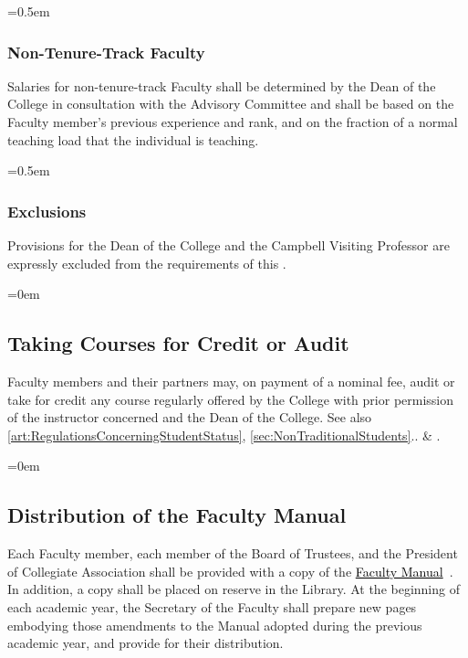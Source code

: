 \documentclass{manual}
\newcommand{\keyword}[1]{\textcolor{black}{#1}}
\newcommand{\facman}{\keyword{\underline{Faculty Manual}}~}
\let\oldsubsection\subsection
\renewcommand\subsection{\leftskip=0em\oldsubsection}
\let\oldsubsubsection\subsubsection
\renewcommand\subsubsection{\leftskip=0.5em\oldsubsubsection}
\begin{document}
\subsubsection{Non-Tenure-Track Faculty}
Salaries for non-tenure-track Faculty shall be determined by the Dean of the College in consultation with the Advisory Committee and shall be based on the Faculty member's previous experience and rank, and on the fraction of a normal teaching load that the individual is teaching.

\subsubsection{Exclusions}
Provisions for the Dean of the College and the Campbell Visiting Professor are expressly excluded from the requirements of this .


\subsection{Taking Courses for Credit or Audit}
Faculty members and their partners may, on payment of a nominal fee, audit or take for credit any course regularly offered by the College with prior permission of the instructor concerned and the Dean of the College. See also \cref{art:RegulationsConcerningStudentStatus}, \cref{sec:NonTraditionalStudents}.. \& .


\subsection{Distribution of the Faculty Manual}
Each Faculty member, each member of the Board of Trustees, and the President of Collegiate Association shall be provided with a copy of the \facman. In addition, a copy shall be placed on reserve in the Library. At the beginning of each academic year, the Secretary of the Faculty shall prepare new pages embodying those amendments to the Manual adopted during the previous academic year, and provide for their distribution.
\end{document}
